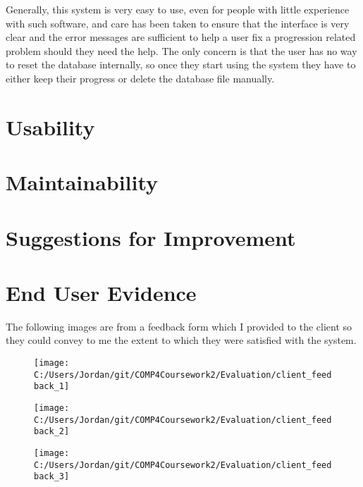 Generally, this system is very easy to use, even for people with little experience with such software, and care has been taken to ensure that the interface is very clear and the error messages are sufficient to help a user fix a progression related problem should they need the help. The only concern is that the user has no way to reset the database internally, so once they start using the system they have to either keep their progress or delete the database file manually.

\section{Usability}

\section{Maintainability}

\section{Suggestions for Improvement}



















\section{End User Evidence}

The following images are from a feedback form which I provided to the client so they could convey to me the extent to which they were satisfied with the system.

\begin{figure}[H]
	\texttt{[image: C:/Users/Jordan/git/COMP4Coursework2/Evaluation/client\_feedback\_1]}
\end{figure}

\begin{figure}[H]
	\texttt{[image: C:/Users/Jordan/git/COMP4Coursework2/Evaluation/client\_feedback\_2]}
\end{figure}

\begin{figure}[H]
	\texttt{[image: C:/Users/Jordan/git/COMP4Coursework2/Evaluation/client\_feedback\_3]}
\end{figure}

